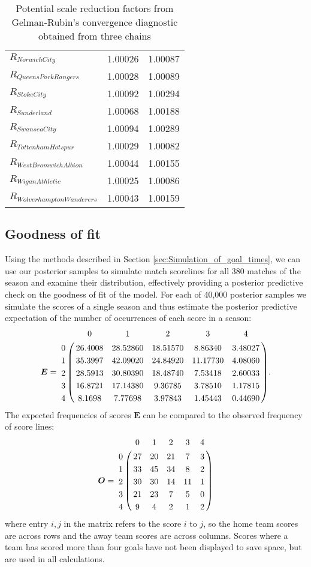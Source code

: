 \begin{table}
{\begin{tabular}{lcc}
\(R_{Norwich City}\)            & 1.00026   & 1.00087 \\
\(R_{Queens Park Rangers}\)     & 1.00028   & 1.00089 \\
\(R_{Stoke City}\)              & 1.00092   & 1.00294 \\
\(R_{Sunderland}\)              & 1.00068   & 1.00188 \\
\(R_{Swansea City}\)            & 1.00094   & 1.00289 \\
\(R_{Tottenham Hotspur}\)       & 1.00029   & 1.00082 \\
\(R_{West Bromwich Albion}\)    & 1.00044   & 1.00155 \\
\(R_{Wigan Athletic}\)          & 1.00025   & 1.00086 \\
\(R_{Wolverhampton Wanderers}\) & 1.00043   & 1.00159 \\
\end{tabular}
}
\caption{\label{gelmanrubin} Potential scale reduction factors from Gelman-Rubin's convergence diagnostic obtained from
three chains}
\end{table}

\subsection{Goodness of fit}
\label{sec:Goodness_of_fit}

Using the methods described in Section \ref{sec:Simulation_of_goal_times}, we can use our posterior samples to simulate
match scorelines for all 380 matches of the season and examine their distribution, effectively providing a posterior
predictive check on the goodness of fit of the model. For each of 40,000 posterior samples we simulate the scores of a
single season and thus estimate the posterior predictive expectation of the number of occurrences of each score in a
season:
\begin{align} 
\boldsymbol{E} = \bordermatrix{
  &    0    &    1     &    2     &    3     &    4    \cr
0 & 26.4008 & 28.52860 & 18.51570 & 8.86340  & 3.48027 \cr
1 & 35.3997 & 42.09020 & 24.84920 & 11.17730 & 4.08060 \cr
2 & 28.5913 & 30.80390 & 18.48740 & 7.53418  & 2.60033 \cr
3 & 16.8721 & 17.14380 &  9.36785 & 3.78510  & 1.17815 \cr
4 &  8.1698 &  7.77698 &  3.97843 & 1.45443  & 0.44690 
}. \label{expectedScores}
\end{align}
The expected frequencies of scores \(\boldsymbol{E}\) can be compared to the observed frequency of score lines:
\begin{align}
\boldsymbol{O} = \bordermatrix{
  & 0  & 1  & 2  & 3  & 4 \cr
0 & 27 & 20 & 21 & 7  & 3 \cr
1 & 33 & 45 & 34 & 8  & 2 \cr
2 & 30 & 30 & 14 & 11 & 1 \cr
3 & 21 & 23 & 7  & 5  & 0 \cr
4 & 9  & 4  & 2  & 1  & 2
} \label{observedScores}
\end{align}
where entry \(i, j\) in the matrix refers to the score \(i\) to \(j\), so the home team scores are across rows and the
away team scores are across columns. Scores where a team has scored more than four goals have not been displayed to save
space, but are used in all calculations.

